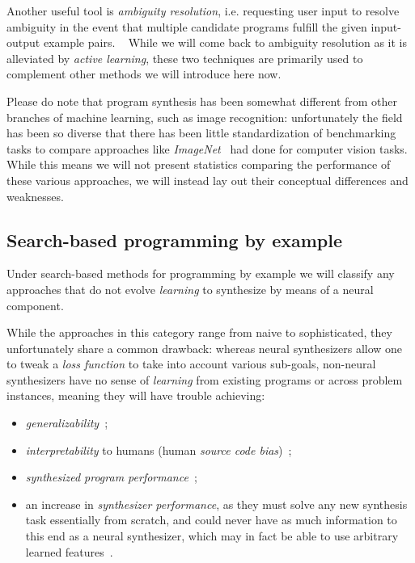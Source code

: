 \documentclass{article}
\begin{document}
Another useful tool is \emph{ambiguity resolution},
i.e. requesting user input to resolve ambiguity
in the event that multiple candidate programs
fulfill the given input-output example pairs.%
~\citep{gulwani2017program}
While we will come back to ambiguity resolution as it is
alleviated by \emph{active learning},
these two techniques are primarily used to complement
other methods we will introduce here now.

Please do note that program synthesis has been somewhat different
from other branches of machine learning, such as image recognition:
unfortunately the field has been so diverse that there has been little
standardization of benchmarking tasks to compare approaches like
\emph{ImageNet}~\citep{deng2009imagenet} had done for computer vision tasks.
While this means we will not present statistics
comparing the performance of these various approaches,
we will instead lay out their conceptual differences and weaknesses.

\subsection{Search-based programming by example}

Under search-based methods for programming by example we will classify any approaches that do not evolve \emph{learning} to synthesize by means of a neural component.

While the approaches in this category range from naive to sophisticated,
they unfortunately share a common drawback:
whereas neural synthesizers allow one to tweak a \emph{loss function} to take into account various sub-goals,
non-neural synthesizers have no sense of \emph{learning}
from existing programs or across problem instances,
meaning they will have trouble achieving:
\begin{itemize}
    \item \emph{generalizability}~\citep{nps};
    \item \emph{interpretability} to humans (human \emph{source code bias})~\citep{nps};
    \item \emph{synthesized program performance}~\citep{schkufza2016stochastic};
    \item an increase in \emph{synthesizer performance},
    as they must solve any new synthesis task essentially from scratch,
    and could never have as much information to this end as a neural synthesizer,
    which may in fact be able to use arbitrary learned features~\citep{odena2020learning}.
\end{itemize}
\end{document}

